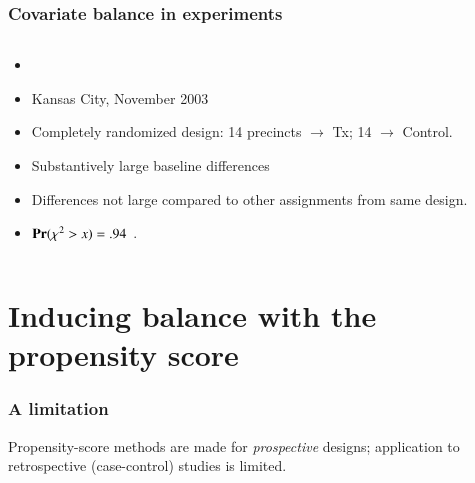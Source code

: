 \begin{frame}%
  \frametitle{Covariate balance in experiments}

\begin{columns}
  \begin{column}{.4\linewidth}
    \begin{itemize}
    \item<1-> \citet{arceneaux:2005}
    \item<1-> Kansas City, November 2003
    \item<1-> Completely randomized design: 14 precincts $\rightarrow$ Tx; 14 $\rightarrow $ Control.

    \item<1-> Substantively large baseline differences
    \item<1-| alert@+> Differences not large compared to other assignments from same design.
    \item<2-> $\mathbf{Pr}(\chi^{2} > x) = .94$ \citep{hansen:bowers:2008}.
    \end{itemize}
  \end{column}
  
\begin{column}{.6\linewidth}
\end{column}
\end{columns}

\end{frame}



\section{Inducing balance with the propensity score}


\begin{frame}
  \frametitle{A limitation}

  Propensity-score methods are made for \textit{prospective} designs;
  application to retrospective (case-control) studies is limited.
\end{frame}


